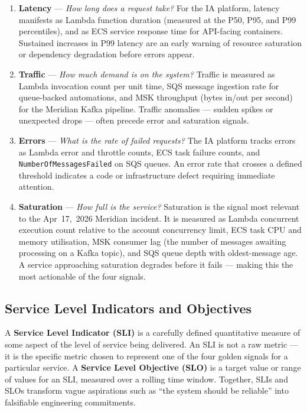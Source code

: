 \begin{enumerate}
    \item \textbf{Latency} --- \emph{How long does a request take?} For
          the IA platform, latency manifests as Lambda function duration
          (measured at the P50, P95, and P99 percentiles), and as ECS
          service response time for API-facing containers. Sustained
          increases in P99 latency are an early warning of resource
          saturation or dependency degradation before errors appear.

    \item \textbf{Traffic} --- \emph{How much demand is on the system?}
          Traffic is measured as Lambda invocation count per unit time,
          SQS message ingestion rate for queue-backed automations, and
          MSK throughput (bytes in/out per second) for the Meridian
          Kafka pipeline. Traffic anomalies --- sudden spikes or
          unexpected drops --- often precede error and saturation
          signals.

    \item \textbf{Errors} --- \emph{What is the rate of failed
          requests?} The IA platform tracks errors as Lambda error and
          throttle counts, ECS task failure counts, and
          \texttt{NumberOfMessagesFailed} on SQS queues. An error rate
          that crosses a defined threshold indicates a code or
          infrastructure defect requiring immediate attention.

    \item \textbf{Saturation} --- \emph{How full is the service?}
          Saturation is the signal most relevant to the Apr~17,~2026
          Meridian incident. It is measured as Lambda concurrent
          execution count relative to the account concurrency limit,
          ECS task CPU and memory utilisation, MSK consumer lag (the
          number of messages awaiting processing on a Kafka topic), and
          SQS queue depth with oldest-message age. A service approaching
          saturation degrades before it fails --- making this the most
          actionable of the four signals.
\end{enumerate}

\subsection{Service Level Indicators and Objectives}

A \textbf{Service Level Indicator (SLI)} is a carefully defined
quantitative measure of some aspect of the level of service being
delivered. An SLI is not a raw metric --- it is the specific metric
chosen to represent one of the four golden signals for a particular
service. A \textbf{Service Level Objective (SLO)} is a target value
or range of values for an SLI, measured over a rolling time window.
Together, SLIs and SLOs transform vague aspirations such as
``the system should be reliable'' into falsifiable engineering
commitments.


